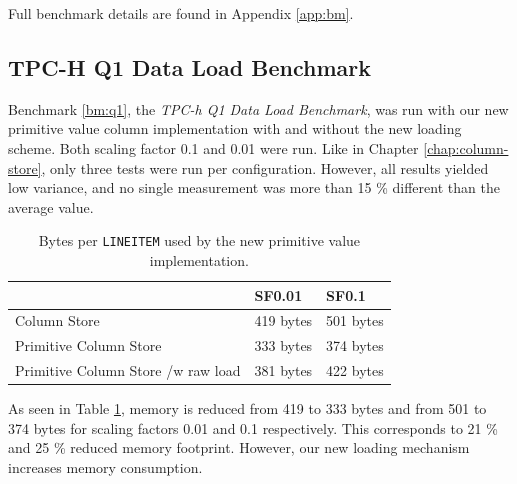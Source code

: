 Full benchmark details are found in Appendix \ref{app:bm}.


\subsection{TPC-H Q1 Data Load Benchmark}
\label{sub:storage-format-tpch-results}
Benchmark \ref{bm:q1}, the \textit{TPC-h Q1 Data Load Benchmark}, was run with our new primitive value column implementation with and without the new loading scheme. Both scaling factor 0.1 and 0.01 were run. Like in Chapter \ref{chap:column-store}, only three tests were run per configuration. However, all results yielded low variance, and no single measurement was more than 15 \% different than the average value.

\begin{table}
    \centering
    \begin{tabularx}{\textwidth}{X | X X}
        & SF0.01 & SF0.1 \\ 
        \hline
        \hline
        Column Store & 419 bytes & 501 bytes \\
        Primitive Column Store & 333 bytes & 374 bytes \\
        Primitive Column Store /w raw load & 381 bytes & 422 bytes \\
    \end{tabularx}
    \caption{Bytes per \texttt{LINEITEM} used by the new primitive value implementation.} 
    \label{tab:primitive-bpl}
\end{table}
As seen in Table \ref{tab:primitive-bpl}, memory is reduced from 419 to 333 bytes and from 501 to 374 bytes for scaling factors 0.01 and 0.1 respectively. This corresponds to 21 \% and 25 \% reduced memory footprint. However, our new loading mechanism increases memory consumption.

